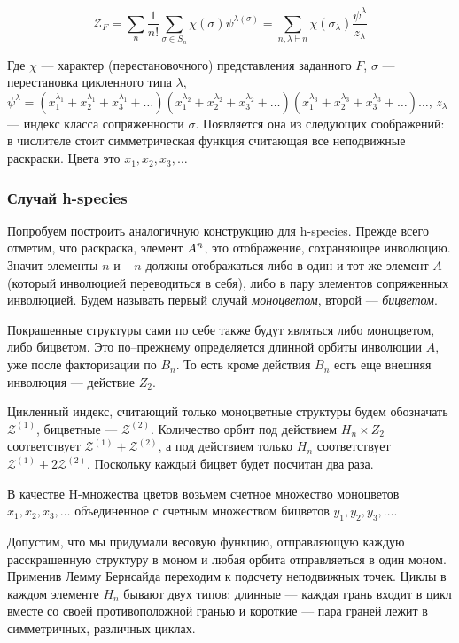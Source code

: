 \begin{equation}
\label{eq:fr}
\mathcal Z_F =
\sum_{n}\frac{1}{n!}\sum_{\sigma \in S_n}\chi(\sigma)\psi^{\lambda(\sigma)} =
\sum_{n, \lambda \vdash n}\chi(\sigma_{\lambda})
\frac{\psi^{\lambda}}{z_{\lambda}}
\end{equation}

Где $\chi$ --- характер (перестановочного) представления заданного $F$, $\sigma$
--- перестановка цикленного типа $\lambda$, 
$\psi^{\lambda} = 
(x_1^{\lambda_1} + x_2^{\lambda_1} + x_3^{\lambda_1} + \dots)
(x_1^{\lambda_2} + x_2^{\lambda_2} + x_3^{\lambda_2} + \dots)
(x_1^{\lambda_3} + x_2^{\lambda_3} + x_3^{\lambda_3} + \dots)
\dots$,
 $z_\lambda$ --- индекс класса сопряженности $\sigma$.
Появляется она из следующих соображений: в числителе стоит симметрическая
функция считающая все неподвижные раскраски. Цвета это $x_1, x_2, x_3, \dots$

\subsubsection{Случай h-species}
Попробуем построить аналогичную конструкцию для h-species.
Прежде всего отметим, что раскраска, элемент $A^{\Bar n}$, это отображение,
сохраняющее инволюцию. Значит элементы $n$ и $-n$ должны отображаться либо в
один и тот же элемент $A$ (который инволюцией переводиться в себя), либо в пару
элементов сопряженных инволюцией. Будем называть первый случай
\emph{моноцветом}, второй --- \emph{бицветом}.	

Покрашенные структуры сами по себе также будут являться либо моноцветом, либо
бицветом. Это по--прежнему определяется длинной орбиты инволюции $A$, уже
после факторизации по $B_n$. То есть кроме действия $B_n$ есть еще внешняя
инволюция --- действие $Z_2$.

Цикленный индекс, считающий только моноцветные структуры будем обозначать
$\mathcal Z^{(1)}$, бицветные --- $\mathcal Z^{(2)}$. Количество орбит под
действием $H_n \times Z_2$ соответствует $\mathcal Z^{(1)} + \mathcal Z^{(2)}$,
а под действием только $H_n$ соответствует $\mathcal Z^{(1)} + 2\mathcal
Z^{(2)}$. Поскольку каждый бицвет будет посчитан два раза.

В качестве H-множества цветов возьмем счетное множество моноцветов $x_1, x_2,
x_3, \dots$ объединенное с счетным множеством бицветов $y_1, y_2, y_3, \dots$.

Допустим, что мы придумали весовую функцию, отправляющую каждую расскрашенную
структуру в моном и любая орбита отправляеться в один моном. Применив Лемму
Бернсайда переходим к подсчету неподвижных точек. Циклы в каждом элементе $H_n$
бывают двух типов:
длинные --- каждая грань входит в цикл вместе со своей противоположной гранью и
короткие --- пара граней лежит в симметричных, различных циклах. 

